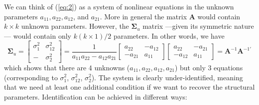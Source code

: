 \documentclass[11pt,a4paper]{report}
\numberwithin{equation}{chapter}
\numberwithin{section}{chapter}
\begin{document}
\begin{quotation}
%
\color{black}
\noindent \hrulefill 
\vspace{-.5cm}

\noindent \hrulefill
\end{quotation}
\bigskip%

\noindent We can think of (\ref{eq:2}) as a system of nonlinear equations in
the unknown parameters $a_{11},a_{22},a_{12}$, and $a_{21}$. More in general
the matrix $\mathbf{A}$ would contain $k\times k$ unknown parameters.
However, the $\mathbf{\Sigma }_{u}$ matrix ---given its symmetric nature---
would contain only $k(k\times 1)/2$ parameters. In other words, we have 
\begin{equation*}
\mathbf{\Sigma }_{u}=\left[ 
\begin{array}{cc}
\sigma _{1}^{2} & \sigma _{12}^{2} \\ 
- & \sigma _{2}^{2}%
\end{array}%
\right] =\frac{1}{a_{11}a_{22}-a_{12}a_{21}}%
\begin{bmatrix}
a_{22} & -a_{12} \\ 
-a_{21} & a_{11}%
\end{bmatrix}%
\begin{bmatrix}
a_{22} & -a_{21} \\ 
-a_{12} & a_{11}%
\end{bmatrix}%
=\mathbf{A}^{-1}\mathbf{A}^{-1\prime }
\end{equation*}%
which shows that there are 4 unknowns ($a_{11},a_{22},a_{12},a_{21}$) but
only 3 equations (corresponding to $\sigma _{1}^{2}$, $\sigma _{12}^{2}$, $%
\sigma _{2}^{2}$). The system is clearly under-identified, meaning that we
need at least one additional condition if we want to recover the structural
parameters. Identification can be achieved in different ways:
\end{document}
